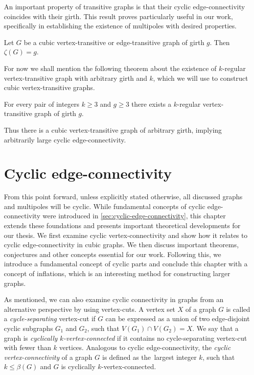 \documentclass[12pt, twoside]{book}
\begin{document}
An important property of transitive graphs is that their cyclic edge-connectivity coincides with their girth. This result proves particularly useful in our work, specifically in establishing the existence of multipoles with desired properties.

\begin{theorem}\label{th:cyclic-connectivity-of-transitive}
	Let $G$ be a cubic \mbox{vertex-transitive} or \mbox{edge-transitive} graph of girth $g$. Then $\zeta(G) = g$.
\end{theorem}

For now we shall mention the following theorem about the existence of $k$-regular vertex-transitive graph with arbitrary girth and $k$, which we will use to construct cubic vertex-transitive graphs.

\begin{theorem}\label{th:vertex-transitive-girth-regular}
	For every pair of integers $k \geq 3$ and $g \geq 3$ there exists a $k$-regular vertex-transitive graph of girth $g$.
\end{theorem}

Thus there is a cubic vertex-transitive graph of arbitrary girth, implying arbitrarily large cyclic \mbox{edge-connectivity}.

\chapter{Cyclic edge-connectivity}\label{ch:cyclic-edge-connectivity}

From this point forward, unless explicitly stated otherwise, all discussed graphs and multipoles will be cyclic. While fundamental concepts of cyclic edge-connectivity were introduced in \cref{sec:cyclic-edge-connectivity}, this chapter extends these foundations and presents important theoretical developments for our thesis. We first examine cyclic vertex-connectivity and show how it relates to cyclic edge-connectivity in cubic graphs. We then discuss important theorems, conjectures and other concepts essential for our work. Following this, we introduce a fundamental concept of cyclic parts and conclude this chapter with a concept of inflations, which is an interesting method for constructing larger graphs.

As mentioned, we can also examine cyclic connectivity in graphs from an alternative perspective by using vertex-cuts. A vertex set $X$ of a graph $G$ is called a \mbox{\textit{cycle-separating}} vertex-cut if $G$ can be expressed as a union of two edge-disjoint cyclic subgraphs $G_1$ and $G_2$, such that $V(G_1) \cap V(G_2) = X$. We say that a graph is \textit{cyclically \mbox{$k$-vertex-connected}} if it contains no cycle-separating vertex-cut with fewer than $k$ vertices. Analogous to cyclic \mbox{edge-connectivity}, the \textit{cyclic \mbox{vertex-connectivity}} of a graph $G$ is defined as the~largest integer $k$, such that $k\leq \beta(G)$ and $G$ is cyclically \mbox{$k$-vertex-connected}.
\end{document}
